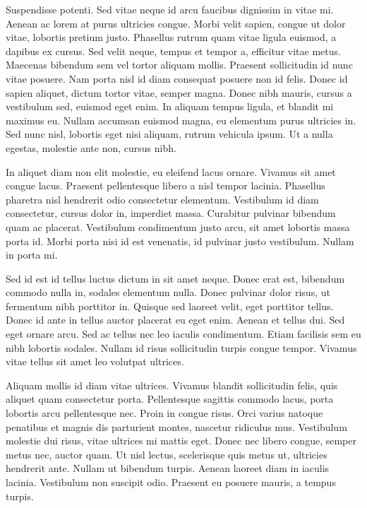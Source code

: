 \documentclass[a4paper,10pt,twoside]{article} %
\begin{document}
Suspendisse potenti.
Sed vitae neque id arcu faucibus dignissim in vitae mi.
Aenean ac lorem at purus ultricies congue.
Morbi velit sapien, congue ut dolor vitae, lobortis pretium justo.
Phasellus rutrum quam vitae ligula euismod, a dapibus ex cursus.
Sed velit neque, tempus et tempor a, efficitur vitae metus.
Maecenas bibendum sem vel tortor aliquam mollis.
Praesent sollicitudin id nunc vitae posuere.
Nam porta nisl id diam consequat posuere non id felis.
Donec id sapien aliquet, dictum tortor vitae, semper magna.
Donec nibh mauris, cursus a vestibulum sed, euismod eget enim.
In aliquam tempus ligula, et blandit mi maximus eu.
Nullam accumsan euismod magna, eu elementum purus ultricies in.
Sed nunc nisl, lobortis eget nisi aliquam, rutrum vehicula ipsum.
Ut a nulla egestas, molestie ante non, cursus nibh.

In aliquet diam non elit molestie, eu eleifend lacus ornare.
Vivamus sit amet congue lacus.
Praesent pellentesque libero a nisl tempor lacinia.
Phasellus pharetra nisl hendrerit odio consectetur elementum.
Vestibulum id diam consectetur, cursus dolor in, imperdiet massa.
Curabitur pulvinar bibendum quam ac placerat.
Vestibulum condimentum justo arcu, sit amet lobortis massa porta id.
Morbi porta nisi id est venenatis, id pulvinar justo vestibulum.
Nullam in porta mi.

Sed id est id tellus luctus dictum in sit amet neque.
Donec erat est, bibendum commodo nulla in, sodales elementum nulla.
Donec pulvinar dolor risus, ut fermentum nibh porttitor in.
Quisque sed laoreet velit, eget porttitor tellus.
Donec id ante in tellus auctor placerat eu eget enim.
Aenean et tellus dui.
Sed eget ornare arcu.
Sed ac tellus nec leo iaculis condimentum.
Etiam facilisis sem eu nibh lobortis sodales.
Nullam id risus sollicitudin turpis congue tempor.
Vivamus vitae tellus sit amet leo volutpat ultrices.

Aliquam mollis id diam vitae ultrices.
Vivamus blandit sollicitudin felis, quis aliquet quam consectetur porta.
Pellentesque sagittis commodo lacus, porta lobortis arcu pellentesque nec.
Proin in congue risus.
Orci varius natoque penatibus et magnis dis parturient montes, nascetur ridiculus mus.
Vestibulum molestie dui risus, vitae ultrices mi mattis eget.
Donec nec libero congue, semper metus nec, auctor quam.
Ut nisl lectus, scelerisque quis metus ut, ultricies hendrerit ante.
Nullam ut bibendum turpis.
Aenean laoreet diam in iaculis lacinia.
Vestibulum non suscipit odio.
Praesent eu posuere mauris, a tempus turpis.
\end{document}
